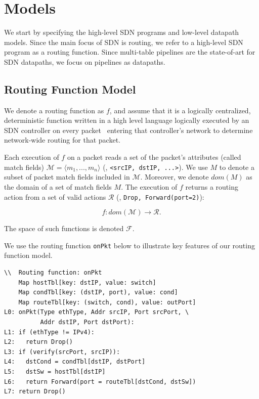 \section{Models}
\label{sec:model-and-main-results}
We start by specifying the high-level SDN programs and low-level datapath models. Since the main focus of SDN is routing, we refer to a high-level SDN program as a routing function. Since multi-table pipelines are the state-of-art for SDN datapaths, we focus on pipelines as datapaths.

\subsection{Routing Function Model}
\label{subsec:function-model}
 We denote a routing function as $f$, and assume that it is a logically centralized, deterministic function written in a high level language logically executed by an SDN controller on every packet~\cite{maple} entering that controller's network to determine network-wide routing for that packet.

Each execution of $f$ on a packet reads a set of the packet's attributes (called match fields) $\mathcal{M} = \langle m_1, ..., m_n \rangle$ (\eg, \texttt{<srcIP, dstIP, ...>}). We use $M$ to denote a subset of packet match fields included in $\mathcal{M}$. Moreover, we denote $dom(M)$ as the domain of a set of match fields $M$. The execution of $f$ returns a routing action from a set of valid actions $\mathcal{R}$ (\eg, \texttt{Drop, Forward(port=2)}):


\begin{equation*}
f : dom(\mathcal{M}) \rightarrow \mathcal{R}.
\end{equation*}

The space of such functions is denoted $\mathcal{F}$.

 We use the routing function \texttt{onPkt} below to illustrate key features of our routing function model.
\begin{verbatim}
\\  Routing function: onPkt
    Map hostTbl[key: dstIP, value: switch]
    Map condTbl[key: (dstIP, port), value: cond]
    Map routeTbl[key: (switch, cond), value: outPort]
L0: onPkt(Type ethType, Addr srcIP, Port srcPort, \
          Addr dstIP, Port dstPort):
L1: if (ethType != IPv4):
L2:   return Drop()
L3: if (verify(srcPort, srcIP)):
L4:   dstCond = condTbl[dstIP, dstPort]
L5:   dstSw = hostTbl[dstIP]
L6:   return Forward(port = routeTbl[dstCond, dstSw])
L7: return Drop()
\end{verbatim}

